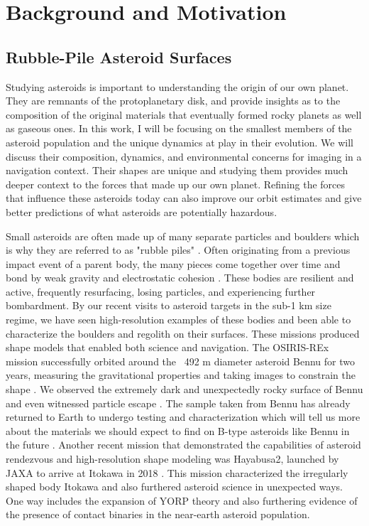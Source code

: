 \chapter{Background and Motivation}
\label{introchap}
\section{Rubble-Pile Asteroid Surfaces} 
Studying asteroids is important to understanding the origin of our own planet. They are remnants of the protoplanetary disk, and provide insights as to the composition of the original materials that eventually formed rocky planets as well as gaseous ones. In this work, I will be focusing on the smallest members of the asteroid population and the unique dynamics at play in their evolution. We will discuss their composition, dynamics, and environmental concerns for imaging in a navigation context. Their shapes are unique and studying them provides much deeper context to the forces that made up our own planet. Refining the forces that influence these asteroids today can also improve our orbit estimates and give better predictions of what asteroids are potentially hazardous. 

Small asteroids are often made up of many separate particles and boulders which is why they are referred to as "rubble piles" \cite{Scheeres2018}. Often originating from a previous impact event of a parent body, the many pieces come together over time and bond by weak gravity and electrostatic cohesion \cite{Walsh2018}. These bodies are resilient and active, frequently resurfacing, losing particles, and experiencing further bombardment. By our recent visits to asteroid targets in the sub-1 km size regime, we have seen high-resolution examples of these bodies and been able to characterize the boulders and regolith on their surfaces. These missions produced shape models that enabled both science and navigation. The OSIRIS-REx mission successfully orbited around the ~492 m diameter asteroid Bennu for two years, measuring the gravitational properties and taking images to constrain the shape \cite{Scheeres2019}. We observed the extremely dark and unexpectedly rocky surface of Bennu and even witnessed particle escape \cite{Hergenrother2019}. The sample taken from Bennu has already returned to Earth to undergo testing and characterization which will tell us more about the materials we should expect to find on B-type asteroids like Bennu in the future \cite{Lauretta2023}. Another recent mission that demonstrated the capabilities of asteroid rendezvous and high-resolution shape modeling was Hayabusa2, launched by JAXA to arrive at Itokawa in 2018 \cite{Watanabe2019}. This mission characterized the irregularly shaped body Itokawa and also furthered asteroid science in unexpected ways. One way includes the expansion of YORP theory and also furthering evidence of the presence of contact binaries in the near-earth asteroid population. 

